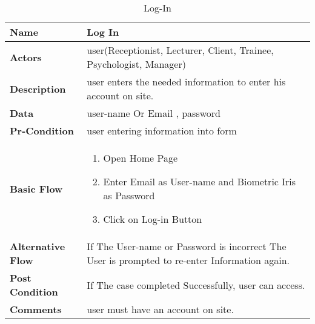 \documentclass[../Psychological_system_web_application.tex]{subfiles}
\begin{document}
	\begin{center}
		\begin{table}[h]
			\begin{tabular}{ | m{4cm} | m{10cm}| } 
				\hline
			 	\textbf{\large Name}& Log In\\ 
				\hline
			  	\textbf{\large Actors}& user(Receptionist, Lecturer, Client, Trainee, Psychologist, Manager)\\ 
				\hline
			  	\textbf{\large Description}& user enters the needed information to enter his account on site.\\ 
				\hline
				\textbf{\large Data}& user-name Or Email , password\\ 
				\hline
				\textbf{\large Pr-Condition}&user entering information into form \\
				\hline
				\textbf{\large Basic Flow}&\begin{enumerate}
				\item
					Open Home Page 
				\item
					Enter Email as User-name and Biometric Iris as Password
				\item
					Click on Log-in Button \end{enumerate}				 \\
				\hline
				\textbf{\large Alternative Flow}& If The User-name or Password is incorrect The User is prompted to re-enter Information again.\\ 
				\hline
				\textbf{\large Post Condition}& If The case completed Successfully, user can access.\\ 
				\hline
				\textbf{\large Comments}& user must have an account on site.\\ 
				\hline
			\end{tabular}
			\caption{Log-In}
			\label{table:LOG_IN}
		\end{table}
	\end{center}
\end{document}
